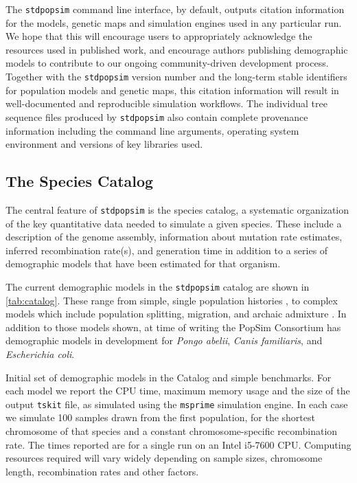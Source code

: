 \documentclass[12pt,halfline,a4paper]{ouparticle}
\newcommand{\stdpopsim}{\texttt{stdpopsim}\xspace}
\newcommand{\tskit}{\texttt{tskit}\xspace}
\begin{document}
The \stdpopsim command line interface, by default, outputs citation information
for the models, genetic maps and simulation engines used in any particular run.
We hope that this will encourage users to appropriately acknowledge the
resources used in published work, and encourage authors
publishing demographic models to contribute to our ongoing community-driven development process.
Together with the \stdpopsim version number and the long-term stable identifiers
for population models and genetic maps,
this citation information will result in well-documented and reproducible
simulation workflows. The individual tree sequence files produced by
\stdpopsim also contain complete provenance information including the command
line arguments, operating system environment and versions of key libraries
used.

\subsection*{The Species Catalog}
The central feature of \stdpopsim is the species catalog, a systematic organization
of the key quantitative data needed to simulate a given species. These include a description
of the genome assembly, information about mutation rate estimates, inferred recombination rate(s), and generation time
in addition to a series of demographic models that have been estimated for that organism.

The current demographic models in the \stdpopsim catalog are shown in \autoref{tab:catalog}.
These range from
simple, single population histories \cite[e.g.,][]{sheehan2016deep},
to complex models which include population splitting, migration, and archaic
admixture \cite[e.g.,][]{ragsdale2019models}.
In addition to those models shown, at time of writing
the PopSim Consortium has demographic models in development for \textit{Pongo abelii}, \textit{Canis familiaris}, and \textit{Escherichia coli}.

\renewcommand{\arraystretch}{1.2}
\begin{table}[t]
\makebox[\textwidth][c]{
    \begin{footnotesize}
    
    \end{footnotesize}
}
\caption{\label{tab:catalog}
Initial set of demographic models in the Catalog and simple benchmarks.
For each model we report the CPU time, maximum memory usage and the
size of the output \tskit file, as simulated using the \texttt{msprime} simulation engine.
In each case we simulate 100 samples
drawn from the first population, for the shortest chromosome of that species
and a constant chromosome-specific recombination rate.
The times reported are for a single run on an Intel i5-7600 CPU.
Computing resources required will vary widely depending on sample sizes, chromosome length,
recombination rates and other factors.
}
\end{table}
\end{document}
